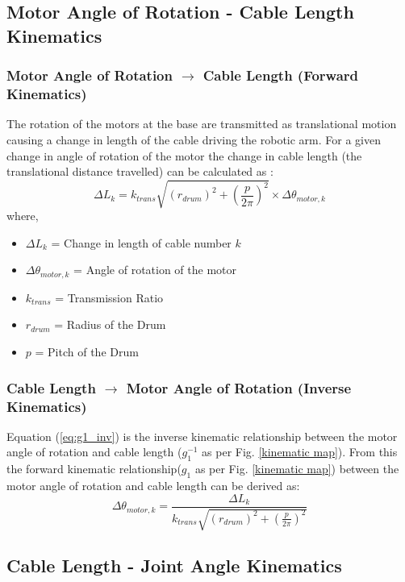 \documentclass[a4paper,12pt]{report}
\begin{document}
\subsection{Motor Angle of Rotation - Cable Length Kinematics}
\subsubsection{Motor Angle of Rotation \textbf{$\longrightarrow$} Cable Length (Forward Kinematics)}
The rotation of the motors at the base are transmitted as translational motion causing a change in length of the cable driving the robotic arm. For a given change in angle of rotation of the motor the change in cable length (the translational distance travelled) can be calculated as \cite{derbel2019new}:
\begin{equation}
\label{eq:g1}
\Delta L_{k} = k_{trans}\sqrt{(r_{drum})^2 + (\frac{p}{2 \pi})^2} \times \Delta \theta_{motor,k}
\end{equation}
where,
\begin{itemize}
	\renewcommand\labelitemi{--}
	\item $\Delta L_{k}$ = Change in length of cable number $k$ 
	\item $\Delta \theta_{motor,k}$ = Angle of rotation of the motor
	\item $k_{trans}$ = Transmission Ratio
	\item $r_{drum}$ = Radius of the Drum
	\item $p$ = Pitch of the Drum
\end{itemize}
\subsubsection{Cable Length \textbf{$\longrightarrow$} Motor Angle of Rotation (Inverse Kinematics)}
Equation (\ref{eq:g1_inv}) is the inverse kinematic relationship between the motor angle of rotation and cable length ($g_{1}^{-1}$ as per Fig. \ref{kinematic map}). From this the forward kinematic relationship($g_{1}$ as per Fig. \ref{kinematic map}) between the motor angle of rotation and cable length can be derived as:
\begin{equation}
\label{eq:g1_inv}
\Delta \theta_{motor,k} = \frac{\Delta L_{k}}{k_{trans}\sqrt{(r_{drum})^2 + (\frac{p}{2 \pi})^2}}
\end{equation}

\subsection{Cable Length - Joint Angle Kinematics}
\end{document}
